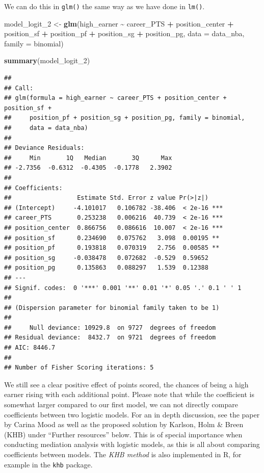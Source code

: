 \documentclass[
]{book}
\newenvironment{Shaded}{\begin{snugshade}}{\end{snugshade}}
\newcommand{\AttributeTok}[1]{\textcolor[rgb]{0.13,0.29,0.53}{#1}}
\newcommand{\FunctionTok}[1]{\textcolor[rgb]{0.13,0.29,0.53}{\textbf{#1}}}
\newcommand{\NormalTok}[1]{#1}
\newcommand{\OtherTok}[1]{\textcolor[rgb]{0.56,0.35,0.01}{#1}}
\newcommand{\SpecialCharTok}[1]{\textcolor[rgb]{0.81,0.36,0.00}{\textbf{#1}}}
\begin{document}
We can do this in \texttt{glm()} the same way as we have done in \texttt{lm()}.

\begin{Shaded}
\begin{Highlighting}[]
\NormalTok{model\_logit\_2 }\OtherTok{\textless{}{-}} \FunctionTok{glm}\NormalTok{(high\_earner }\SpecialCharTok{\textasciitilde{}}\NormalTok{ career\_PTS }\SpecialCharTok{+}\NormalTok{ position\_center }\SpecialCharTok{+}\NormalTok{ position\_sf }\SpecialCharTok{+}\NormalTok{  position\_pf }\SpecialCharTok{+}\NormalTok{ position\_sg }\SpecialCharTok{+}\NormalTok{ position\_pg,}
                     \AttributeTok{data =}\NormalTok{ data\_nba,}
                     \AttributeTok{family =}\NormalTok{ binomial)}

\FunctionTok{summary}\NormalTok{(model\_logit\_2)}
\end{Highlighting}
\end{Shaded}

\begin{verbatim}
## 
## Call:
## glm(formula = high_earner ~ career_PTS + position_center + position_sf + 
##     position_pf + position_sg + position_pg, family = binomial, 
##     data = data_nba)
## 
## Deviance Residuals: 
##     Min       1Q   Median       3Q      Max  
## -2.7356  -0.6312  -0.4305  -0.1778   2.3902  
## 
## Coefficients:
##                  Estimate Std. Error z value Pr(>|z|)    
## (Intercept)     -4.101017   0.106782 -38.406  < 2e-16 ***
## career_PTS       0.253238   0.006216  40.739  < 2e-16 ***
## position_center  0.866756   0.086616  10.007  < 2e-16 ***
## position_sf      0.234690   0.075762   3.098  0.00195 ** 
## position_pf      0.193818   0.070319   2.756  0.00585 ** 
## position_sg     -0.038478   0.072682  -0.529  0.59652    
## position_pg      0.135863   0.088297   1.539  0.12388    
## ---
## Signif. codes:  0 '***' 0.001 '**' 0.01 '*' 0.05 '.' 0.1 ' ' 1
## 
## (Dispersion parameter for binomial family taken to be 1)
## 
##     Null deviance: 10929.8  on 9727  degrees of freedom
## Residual deviance:  8432.7  on 9721  degrees of freedom
## AIC: 8446.7
## 
## Number of Fisher Scoring iterations: 5
\end{verbatim}

We still see a clear positive effect of points scored, the chances of
being a high earner rising with each additional point. Please note that while
the coefficient is somewhat larger compared to our first model, we can
not directly compare coefficients between two logistic models. For an in depth
discussion, see the paper by Carina Mood as well as the proposed solution by
Karlson, Holm \& Breen (KHB) under ``Further resources'' below. This is of special
importance when conducting mediation analysis with logistic models, as this is
all about comparing coefficients between models. The \emph{KHB method} is
also implemented in R, for example in the \texttt{khb} package.
\end{document}
